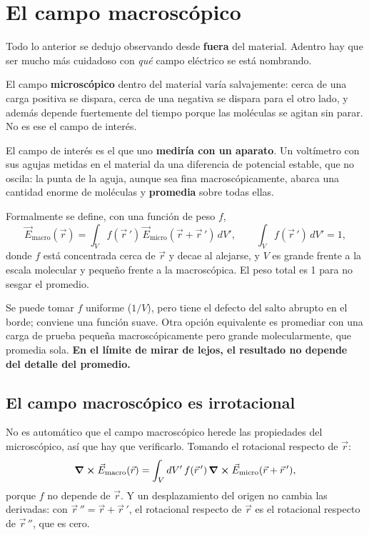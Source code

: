 \documentclass[12pt,a4paper]{article}
\begin{document}
\section{El campo macroscópico}

Todo lo anterior se dedujo observando desde \textbf{fuera} del material. Adentro
hay que ser mucho más cuidadoso con \emph{qué} campo eléctrico se está nombrando.

El campo \textbf{microscópico} dentro del material varía salvajemente: cerca de
una carga positiva se dispara, cerca de una negativa se dispara para el otro
lado, y además depende fuertemente del tiempo porque las moléculas se agitan sin
parar. No es ese el campo de interés.

El campo de interés es el que uno \textbf{mediría con un aparato}. Un voltímetro
con sus agujas metidas en el material da una diferencia de potencial estable, que
no oscila: la punta de la aguja, aunque sea fina macroscópicamente, abarca una
cantidad enorme de moléculas y \textbf{promedia} sobre todas ellas.

Formalmente se define, con una función de peso $f$,
\[
\vec E_{\text{macro}}(\vec r) = \int_V f(\vec r\,')\,
\vec E_{\text{micro}}(\vec r + \vec r\,')\, dV',
\qquad \int_V f(\vec r\,')\, dV' = 1,
\]
donde $f$ está concentrada cerca de $\vec r$ y decae al alejarse, y $V$ es grande
frente a la escala molecular y pequeño frente a la macroscópica. El peso total es
1 para no sesgar el promedio.

\begin{notebox}
Se puede tomar $f$ uniforme ($1/V$), pero tiene el defecto del salto abrupto en
el borde; conviene una función suave. Otra opción equivalente es promediar con
una carga de prueba pequeña macroscópicamente pero grande molecularmente, que
promedia sola. \textbf{En el límite de mirar de lejos, el resultado no depende
del detalle del promedio.}
\end{notebox}

\subsection{El campo macroscópico es irrotacional}

No es automático que el campo macroscópico herede las propiedades del
microscópico, así que hay que verificarlo. Tomando el rotacional respecto de
$\vec r$:
\[
\curl \vec E_{\text{macro}}(\vec r) = \int_V dV' \, f(\vec r\,')\,
\curl \vec E_{\text{micro}}(\vec r + \vec r\,') ,
\]
porque $f$ no depende de $\vec r$. Y un desplazamiento del origen no cambia las
derivadas: con $\vec r\,'' = \vec r + \vec r\,'$, el rotacional respecto de
$\vec r$ es el rotacional respecto de $\vec r\,''$, que es cero.
\end{document}
